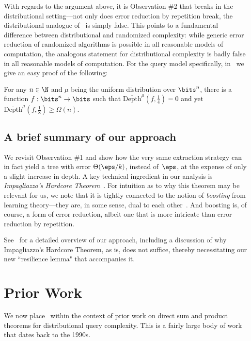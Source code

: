 With regards to the argument above, it is Observation \#2 that breaks in the distributional setting---not only does error reduction by repetition break, the distributional analogue of~ is simply false. This points to a fundamental difference between distributional and randomized complexity: while generic error reduction of randomized algorithms is possible in all reasonable models of computation, the analogous statement for distributional complexity is badly false in all reasonable models of computation. For the query model specifically, in~ we give an easy proof of the following: 

\begin{fact}
    \label{fact:no-boosting}
    For any $n \in \N$ and $\mu$ being the uniform distribution over $\bits^n$, there is a function $f:\bits^n \to \bits$ such that $\overline{\mathrm{Depth}}^{\mu}(f,\tfrac{1}{4}) = 0$ and yet $\overline{\mathrm{Depth}}^{\mu}(f,\tfrac{1}{8}) \geq \Omega(n).$
\end{fact}


\subsection{A brief summary of our approach}
We revisit Observation \#1 and show how the very same extraction strategy can in fact yield a tree with error $\Theta(\eps/k)$, instead of~$\eps$, at the expense of only a slight increase in depth.  A key technical ingredient in our analysis is {\sl Impagliazzo's Hardcore Theorem}~\cite{Imp95}. For intuition as to why this theorem may be relevant for us, we note that it is tightly connected to the notion of {\sl boosting} from learning theory---they are, in some sense, dual to each other~\cite{KS03}. And boosting is, of course, a form of error reduction, albeit one that is more intricate than error reduction by repetition. 

See~ for a detailed overview of our approach, including a discussion of why Impagliazzo's Hardcore Theorem, as is, does not suffice, thereby necessitating our new ``resilience lemma" that accompanies it.  


    
\section{Prior Work}
\label{sec:background}

We now place~ within the context of prior work on direct sum and product theorems for distributional query complexity. This is a fairly large body of work that dates back to the 1990s. 

